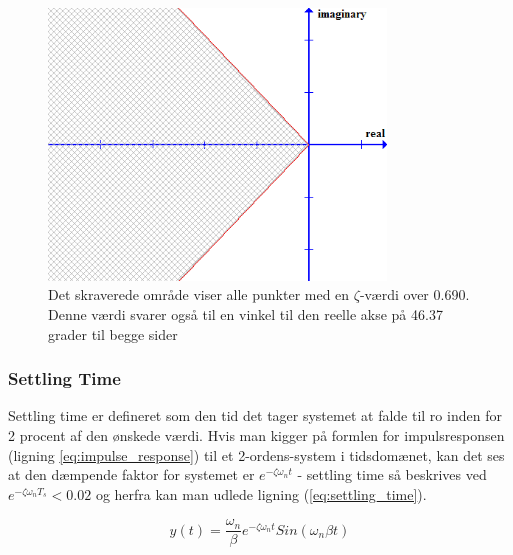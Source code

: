 \begin{figure}[ht]
	\begin{center}
		\includegraphics[width=0.8\textwidth]{Billeder/Overshoot.PNG}
	\end{center}
\caption{Det skraverede område viser alle punkter med en $\zeta$-værdi over 0.690. Denne værdi svarer også til en vinkel til den reelle akse på 46.37 grader til begge sider}
\label{fig:Overshoot}
\end{figure}

\subsubsection{Settling Time}

Settling time er defineret som den tid det tager systemet at falde til ro inden for 2 procent af den ønskede værdi. Hvis man kigger på formlen for impulsresponsen (ligning \ref{eq:impulse_response})  til et 2-ordens-system i tidsdomænet, kan det ses at den dæmpende faktor for systemet er $e^{-\zeta\omega_{n}t}$ - settling time så beskrives ved $e^{-\zeta\omega_{n}T_{s}}<0.02$ og herfra kan man udlede ligning (\ref{eq:settling_time}).

\begin{equation}\label{eq:impulse_response}
y(t)=\frac{\omega_{n}}{\beta}e^{-\zeta\omega_{n}t}Sin(\omega_{n}\beta t)
\end{equation}

